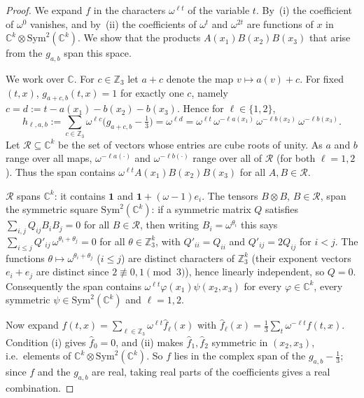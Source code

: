 \documentclass[11pt,letterpaper]{article}
\theoremstyle{remark}
\newcommand{\Z}{\mathbb{Z}}
\newcommand{\C}{\mathbb{C}}
\newcommand{\Sym}{\mathrm{Sym}}
\begin{document}
\begin{proof}
We expand $f$ in the characters $\omega^{\ell t}$ of the variable $t$. By~(i) the coefficient of
$\omega^{0}$ vanishes, and by~(ii) the coefficients of $\omega^{t}$ and $\omega^{2t}$ are functions of $x$
in $\C^k\otimes\Sym^2(\C^k)$. We show that the products $A(x_1)B(x_2)B(x_3)$ that arise from the $g_{a,b}$
span this space.

We work over $\C$. For $c\in\Z_3$ let $a+c$ denote the map $v\mapsto a(v)+c$. For fixed $(t,x)$,
$g_{a+c,b}(t,x)=1$ for exactly one $c$, namely $c=d:=t-a(x_1)-b(x_2)-b(x_3)$. Hence for
$\ell\in\{1,2\}$,
\[
 h_{\ell,a,b}:=\sum_{c\in\Z_3}\omega^{\ell c}\big(g_{a+c,b}-\tfrac13\big) = \omega^{\ell d}
 = \omega^{\ell t}\,\omega^{-\ell a(x_1)}\,\omega^{-\ell b(x_2)}\,\omega^{-\ell b(x_3)} .
\]
Let $\mathcal R\subseteq\C^k$ be the set of vectors whose entries are cube roots of unity. As $a$ and $b$
range over all maps, $\omega^{-\ell a(\cdot)}$ and $\omega^{-\ell b(\cdot)}$ range over all of $\mathcal R$
(for both $\ell=1,2$). Thus the span contains $\omega^{\ell t}A(x_1)B(x_2)B(x_3)$ for all $A,B\in\mathcal R$.

$\mathcal R$ spans $\C^k$: it contains $\mathbf 1$ and $\mathbf 1+(\omega-1)e_i$. The tensors $B\otimes B$,
$B\in\mathcal R$, span the symmetric square $\Sym^2(\C^k)$: if a symmetric matrix $Q$ satisfies
$\sum_{i,j}Q_{ij}B_iB_j=0$ for all $B\in\mathcal R$, then writing $B_i=\omega^{\theta_i}$ this says
$\sum_{i\le j}Q'_{ij}\,\omega^{\theta_i+\theta_j}=0$ for all $\theta\in\Z_3^k$, with
$Q'_{ii}=Q_{ii}$ and $Q'_{ij}=2Q_{ij}$ for $i<j$. The functions $\theta\mapsto\omega^{\theta_i+\theta_j}$
($i\le j$) are distinct characters of $\Z_3^k$ (their exponent vectors $e_i+e_j$ are distinct since
$2\not\equiv 0,1 \pmod 3$), hence linearly independent, so $Q=0$. Consequently the span contains
$\omega^{\ell t}\varphi(x_1)\psi(x_2,x_3)$ for every $\varphi\in\C^k$, every symmetric
$\psi\in\Sym^2(\C^k)$ and $\ell=1,2$.

Now expand $f(t,x)=\sum_{\ell\in\Z_3}\omega^{\ell t}\hat f_\ell(x)$ with
$\hat f_\ell(x)=\frac13\sum_t\omega^{-\ell t}f(t,x)$. Condition (i) gives $\hat f_0=0$, and (ii) makes
$\hat f_1,\hat f_2$ symmetric in $(x_2,x_3)$, i.e.\ elements of $\C^k\otimes\Sym^2(\C^k)$. So $f$ lies
in the complex span of the $g_{a,b}-\frac13$; since $f$ and the $g_{a,b}$ are real, taking real parts of
the coefficients gives a real combination.
\end{proof}
\end{document}
